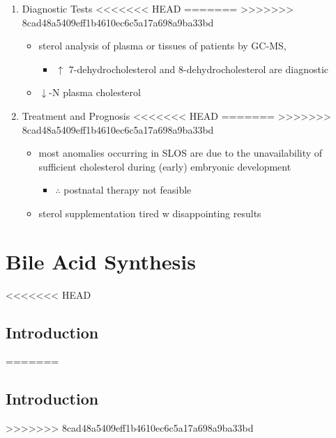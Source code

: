 \documentclass{scrartcl}
\begin{document}
\begin{itemize}
\begin{enumerate}
\begin{enumerate}
\begin{enumerate}

\item Diagnostic Tests
<<<<<<< HEAD
\label{sec:orgc742c5b}
=======
\label{sec:org321e17d}
>>>>>>> 8cad48a5409eff1b4610ec6c5a17a698a9ba33bd
\begin{itemize}
\item sterol analysis of plasma or tissues of patients by GC-MS,
\begin{itemize}
\item \(\uparrow\) 7-dehydrocholesterol and 8-dehydrocholesterol are diagnostic
\end{itemize}
\item \(\downarrow\)-N plasma cholesterol
\end{itemize}

\item Treatment and Prognosis
<<<<<<< HEAD
\label{sec:org1bc9a71}
=======
\label{sec:org3801b7c}
>>>>>>> 8cad48a5409eff1b4610ec6c5a17a698a9ba33bd
\begin{itemize}
\item most anomalies occurring in SLOS are due to the unavailability of
sufficient cholesterol during (early) embryonic development
\begin{itemize}
\item \(\therefore\) postnatal therapy not feasible
\end{itemize}
\item sterol supplementation tired w disappointing results
\end{itemize}
\end{enumerate}
\section{Bile Acid Synthesis}
<<<<<<< HEAD
\label{sec:org884e698}
\subsection{Introduction}
\label{sec:org8491144}
=======
\label{sec:orge18ab6d}
\subsection{Introduction}
\label{sec:org47275b2}
>>>>>>> 8cad48a5409eff1b4610ec6c5a17a698a9ba33bd


\end{enumerate}
\end{enumerate}
\end{itemize}
\end{document}
